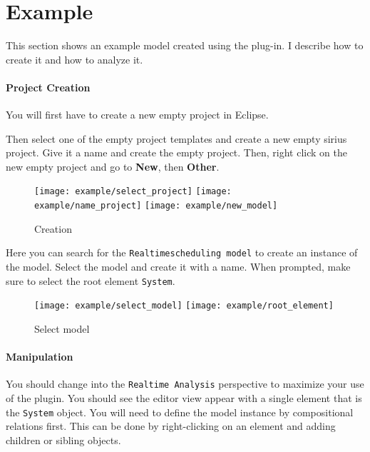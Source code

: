 \pagebreak
\section{Example}
This section shows an example model created using the plug-in. I describe
how to create it and how to analyze it.
\paragraph{Project Creation}
You will first have to create a new empty project in Eclipse.


Then select one of the empty project templates and create
a new empty sirius project. Give it a name and create the
empty project. Then, right click on the new empty project
and go to \textbf{New}, then \textbf{Other}. 
\begin{figure}[H]
    \centering
    \texttt{[image: example/select\_project]}
    \texttt{[image: example/name\_project]}
    \texttt{[image: example/new\_model]}
    \caption{Creation}
\end{figure}

Here you can search for the \texttt{Realtimescheduling model} to create
an instance of the model. Select the model and create it with a name.
When prompted, make sure to select the root element \texttt{System}.
\begin{figure}[H]
    \centering
    \texttt{[image: example/select\_model]}
    \texttt{[image: example/root\_element]}
    \caption{Select model}
\end{figure}

\paragraph{Manipulation}
You should change into the \texttt{Realtime Analysis} perspective to
maximize your use of the plugin. You should see the editor view appear
with a single element that is the \texttt{System} object. You will need
to define the model instance by compositional relations first. This
can be done by right-clicking on an element and adding children or sibling
objects.

